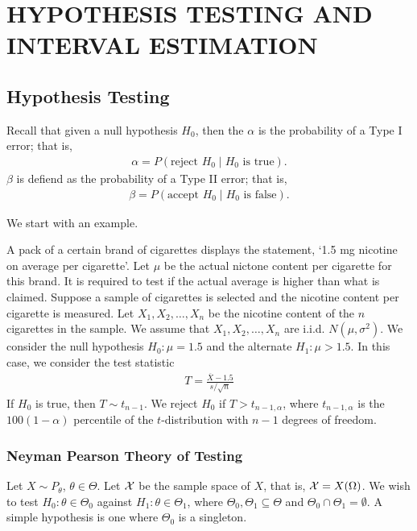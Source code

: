 \chapter{HYPOTHESIS TESTING AND INTERVAL ESTIMATION}

\section{Hypothesis Testing}

Recall that given a null hypothesis $H_{0}$, then the  $\alpha$ is the probability of a Type I error; that is,
\begin{align}
    \alpha = P(\text{reject } H_{0} \mid H_{0} \text{ is true}).
\end{align}
$\beta$ is defiend as the probability of a Type II error; that is,
\begin{align}
    \beta = P(\text{accept } H_{0} \mid H_{0} \text{ is false}).
\end{align}


We start with an example.

\begin{example}
    A pack of a certain brand of cigarettes displays the statement, `1.5 mg nicotine on average per cigarette'. Let $\mu$ be the actual nictone content per cigarette for this brand. It is required to test if the actual average is higher than what is claimed. Suppose a sample of cigarettes is selected and the nicotine content per cigarette is measured. Let $X_{1}, X_{2}, \ldots, X_{n}$ be the nicotine content of the $n$ cigarettes in the sample. We assume that $X_{1}, X_{2}, \ldots, X_{n}$ are i.i.d. $N(\mu, \sigma^{2})$. We consider the null hypothesis $H_{0}:\mu = 1.5$ and the alternate $H_{1}:\mu > 1.5$. In this case, we consider the test statistic
    \begin{align}
        T = \frac{\overline{X} - 1.5}{s/\sqrt{n}}
    \end{align}
    If $H_{0}$ is true, then $T \sim t_{n-1}$. We reject $H_{0}$ if $T > t_{n-1,\alpha}$, where $t_{n-1,\alpha}$ is the $100(1-\alpha)$ percentile of the $t$-distribution with $n-1$ degrees of freedom.
\end{example}

\subsection{Neyman Pearson Theory of Testing}

Let $X \sim P_{\theta}$, $\theta \in \Theta$. Let $\mathcal{X}$ be the sample space of $X$, that is, $\mathcal{X} = X(\Omega)$. We wish to test $H_{0}:\theta \in \Theta_{0}$ against $H_{1}:\theta \in \Theta_{1}$, where $\Theta_{0},\Theta_{1} \subseteq \Theta$ and $\Theta_{0} \cap \Theta_{1} = \emptyset$. A simple hypothesis is one where $\Theta_{0}$ is a singleton.

